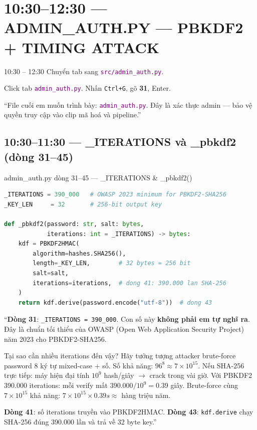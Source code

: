 \documentclass[12pt, a4paper]{article}
\newcommand{\fpath}[1]{\texttt{\textcolor{purple}{#1}}}
\begin{document}
\section{10:30--12:30 --- ADMIN\_AUTH.PY --- PBKDF2 + TIMING ATTACK}

\begin{timing}{10:30 -- 12:30}
Chuyển tab sang \fpath{src/admin\_auth.py}.
\end{timing}

\begin{doact}
Click tab \fpath{admin\_auth.py}.
Nhấn \texttt{Ctrl+G}, gõ \textbf{31}, Enter.
\end{doact}

\begin{say}
``File cuối em muốn trình bày: \fpath{admin\_auth.py}.
Đây là xác thực admin --- bảo vệ quyền truy cập vào clip mã hoá và pipeline.''
\end{say}

\subsection{10:30--11:30 --- \_ITERATIONS và \_pbkdf2 (dòng 31--45)}

\begin{code}{admin\_auth.py dòng 31--45 --- \_ITERATIONS \& \_pbkdf2()}
\begin{lstlisting}[language=Python, firstnumber=31]
_ITERATIONS = 390_000   # OWASP 2023 minimum for PBKDF2-SHA256
_KEY_LEN     = 32       # 256-bit output key

def _pbkdf2(password: str, salt: bytes,
            iterations: int = _ITERATIONS) -> bytes:
    kdf = PBKDF2HMAC(
        algorithm=hashes.SHA256(),
        length=_KEY_LEN,        # 32 bytes = 256 bit
        salt=salt,
        iterations=iterations,  # dong 41: 390.000 lan SHA-256
    )
    return kdf.derive(password.encode("utf-8"))  # dong 43
\end{lstlisting}
\end{code}

\begin{say}
``\textbf{Dòng 31}: \texttt{\_ITERATIONS = 390\_000}.
Con số này \textbf{không phải em tự nghĩ ra}.
Đây là chuẩn tối thiểu của OWASP (Open Web Application Security Project) năm 2023
cho PBKDF2-SHA256.

Tại sao cần nhiều iterations đến vậy?
Hãy tưởng tượng attacker brute-force password 8 ký tự mixed-case + số.
Số khả năng: $96^8 \approx 7 \times 10^{15}$.
Nếu SHA-256 trực tiếp: máy hiện đại tính $10^9$ hash/giây $\to$ crack trong vài giờ.
Với PBKDF2 390.000 iterations: mỗi verify mất $390.000 / 10^9 = 0.39$ giây.
Brute-force cùng $7 \times 10^{15}$ khả năng: $7 \times 10^{15} \times 0.39s \approx$ hàng triệu năm.

\textbf{Dòng 41}: số iterations truyền vào PBKDF2HMAC.
\textbf{Dòng 43}: \texttt{kdf.derive} chạy SHA-256 đúng 390.000 lần và trả về 32 byte key.''
\end{say}
\end{document}
